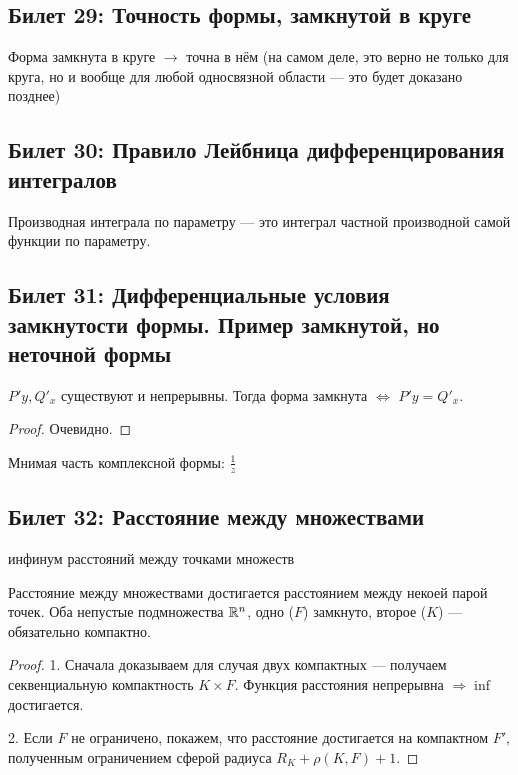 \documentclass[12pt, a4paper, oneside]{memoir}
\begin{document}
\subsection{Билет 29: Точность формы, замкнутой в круге} Форма замкнута в круге $→$ точна в нём 
(на самом деле, это верно не только для круга, 
но и вообще для любой односвязной области — это будет доказано позднее)



\subsection{Билет 30: Правило Лейбница дифференцирования интегралов}
Производная интеграла по параметру 
— это интеграл частной производной самой функции по параметру.


\subsection{Билет 31: Дифференциальные условия замкнутости формы. Пример замкнутой, но неточной формы}

\begin{theorem} 
    $P'y, Q'_x$ существуют и непрерывны. Тогда форма замкнута $\Leftrightarrow$ $P'y = Q'_x$.

    \begin{proof}
        Очевидно.
    \end{proof}
\end{theorem}

\begin{example}
    Мнимая часть комплексной формы: $\frac{1}{z}$
\end{example}
\subsection{Билет 32: Расстояние между множествами}

\begin{definition} 
    инфинум расстояний между точками множеств
\end{definition}

\begin{theorem} 
    Расстояние между множествами достигается расстоянием между некоей парой точек.
    Оба непустые подмножества ${\mathbb{R}}^n$, одно ($F$) замкнуто, второе ($K$) — обязательно компактно.

    \begin{proof}
        1. Сначала доказываем для случая двух компактных — получаем секвенциальную компактность $K × F$.
        Функция расстояния непрерывна $\Rightarrow \inf$ достигается.
        
        2. Если $F$ не ограничено, покажем, что расстояние достигается на компактном $F'$, 
        полученным ограничением сферой радиуса $R_K + \rho(K, F) + 1$.
    \end{proof}
\end{theorem}
\end{document}
